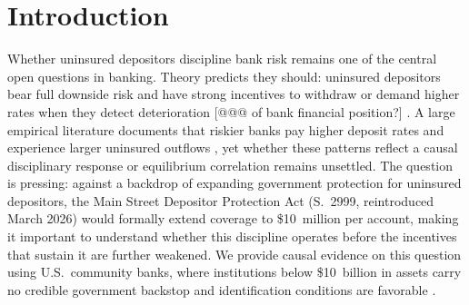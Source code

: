 
\section{Introduction}
\label{sec:intro}

Whether uninsured depositors discipline bank risk remains one of the central open questions in banking. Theory
predicts they should: uninsured depositors bear full downside risk and have strong
incentives to withdraw or demand higher rates when they detect deterioration [@@@ of bank financial position?]
\citep{calomiris1991role, diamond2001liquidity}.  A large empirical literature
documents that riskier banks pay higher deposit rates and experience larger
uninsured outflows \citep{park1995market, martinez2001depositors,
maechler2006dynamic, iyer2016tale, egan2017deposit}, yet whether these patterns
reflect a causal disciplinary response or equilibrium correlation remains
unsettled.  The question is pressing: against a backdrop of expanding government protection
for uninsured depositors, the Main Street Depositor Protection Act (S.~2999,
reintroduced March 2026) would formally extend coverage to \$10~million per
account, making it important to understand whether this discipline operates
before the incentives that sustain it are further weakened.  We provide causal evidence on this question using U.S.\ community banks, where
institutions below \$10~billion in assets carry no credible government
backstop and identification conditions are favorable
\citep{o1990deposit, flannery1996evidence}.

